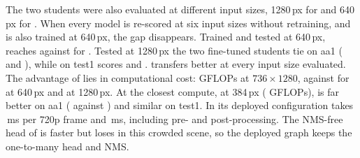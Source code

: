 The two students were also evaluated at different input sizes, 1280\,px for \yolo{} and 640\,px for \rfdetr{}.
When every model is re-scored at six input sizes without retraining, and \yolo{} is also trained at 640\,px,
the gap disappears.
Trained and tested at 640\,px, \yolo{} reaches \MsRsixAa{} against \MsRfFtAa{} for \rfdetr{}. Tested at 1280\,px
the two fine-tuned students tie on aa1 (\RsFteFAa{} and \RsRfFtFAa), while on test1 \rfdetr{} scores \RsRfFtFHo{}
and \yolo{} \RsFteFHo. \rfdetr{} transfers better at every input size evaluated. The advantage of \yolo{} lies in computational cost:
\CsYFGf{} GFLOPs at $736{\times}1280$, against \CsRCGf{} for \rfdetr{} at 640\,px and \CsRFGf{} at 1280\,px. At the
closest compute, \rfdetr{} at 384\,px (\CsRAGf{} GFLOPs), \yolo{} is far better on aa1 (\RsFteFAa{} against
\RsRfFtAAa) and similar on test1. In its deployed configuration \yolo{} takes \LatYoloDep\,ms per 720p frame and
\rfdetr{} \LatRfDep\,ms, including pre- and post-processing. The NMS-free head of \yolo{} is faster but loses
\NmsFreeApLoss{} \AP{} in this crowded scene, so the deployed graph keeps the one-to-many head and NMS.

